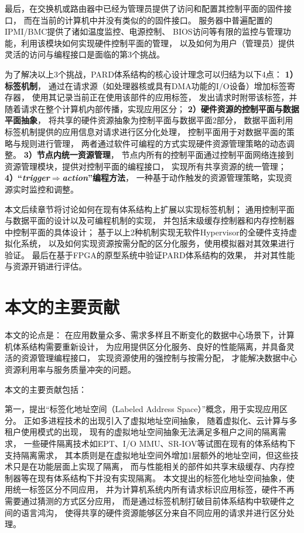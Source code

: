 最后，在交换机或路由器中已经为管理员提供了访问和配置其控制平面的固件接口，
而在当前的计算机中并没有类似的的固件接口。
服务器中普遍配置的IPMI/BMC\cite{ipmi}提供了诸如温度监控、电源控制、
BIOS访问等有限的监控与管理功能，利用该模块如何实现硬件控制平面的管理，
以及如何为用户（管理员）提供灵活的访问与编程接口是面临的第3个挑战。

为了解决以上3个挑战，PARD体系结构的核心设计理念可以归结为以下4点：
\textbf{1）标签机制}，
通过在请求源（如处理器核或具有DMA功能的I/O设备）增加标签寄存器，
使用其记录当前正在使用该部件的应用标签，
发出请求时附带该标签，并随着请求在整个计算机内部传播，实现应用区分；
\textbf{2）硬件资源的控制平面与数据平面抽象}，
将共享的硬件资源抽象为控制平面与数据平面2部分，
数据平面利用标签机制提供的应用信息对请求进行区分化处理，
控制平面用于对数据平面的策略与规则进行管理，
两者通过软件可编程的方式实现硬件资源管理策略的动态调整。
\textbf{3）节点内统一资源管理}，
节点内所有的控制平面通过控制平面网络连接到资源管理模块，提供对控制平面的编程接口，
实现所有共享资源的统一管理；
\textbf{4）``\emph{trigger$\Rightarrow$action}''编程方法}，
一种基于动作触发的资源管理策略，实现资源实时监控和调整。

本文后续章节将讨论如何在现有体系结构上扩展以实现标签机制；
通用控制平面与数据平面的设计以及可编程机制的实现，
并包括末级缓存控制器和内存控制器中控制平面的具体设计；
基于以上2种机制实现无软件Hypervisor的全硬件支持虚拟化系统，
以及如何实现资源按需分配的区分化服务，使用模拟器对其效果进行验证。
最后在基于FPGA的原型系统中验证PARD体系结构的效果，
并对其性能与资源开销进行评估。


\section{本文的主要贡献}

本文的论点是：
在应用数量众多、需求多样且不断变化的数据中心场景下，计算机体系结构需要重新设计，
为应用提供区分化服务、良好的性能隔离，并具备灵活的资源管理编程接口，
实现资源使用的强控制与按需分配，
才能解决数据中心资源利用率与服务质量冲突的问题。

本文的主要贡献包括：

第一，提出``标签化地址空间（Labeled Address Space）''概念，用于实现应用区分。
正如多进程技术的出现引入了虚拟地址空间抽象，
随着虚拟化、云计算与多租户使用模式的出现，
现有的虚拟地址空间抽象无法满足多租户之间的隔离需求，
一些硬件隔离技术如EPT、I/O MMU、SR-IOV等试图在现有的体系结构下支持隔离需求，
其本质则是在虚拟地址空间外增加1层额外的地址空间，但这些技术只是在功能层面上实现了隔离，
而与性能相关的部件如共享末级缓存、内存控制器等在现有体系结构下并没有实现隔离。
本文提出的标签化地址空间抽象，使用统一标签区分不同应用，
并为计算机系统内所有请求标识应用标签，硬件不再需要通过猜测的方式区分应用，
而是通过标签机制打破目前体系结构中软硬件之间的语言鸿沟，
使得共享的硬件资源能够区分来自不同应用的请求并进行区分处理。

